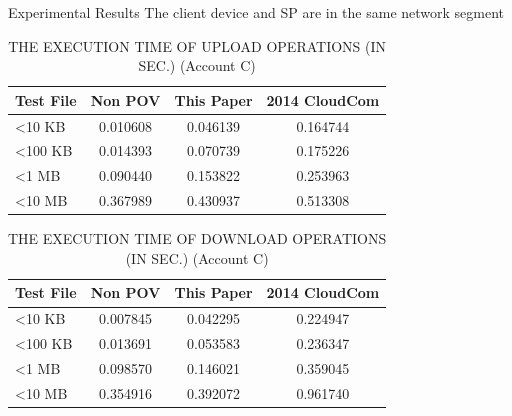 \documentclass{beamer}
\begin{document}
\begin{CJK}{UTF8}{bkai}
\begin{frame}{Experimental Results}
{The client device and SP are in the same network segment}
	\scriptsize
    \begin{table}[]
    \large
    \centering
    \caption{THE EXECUTION TIME OF \alert{UPLOAD} OPERATIONS (IN SEC.) (Account C)}
    \begin{tabular}{lccc}
        Test File        & Non POV  & This Paper & 2014 CloudCom \\ \hline
        \textless 10 KB  & 0.010608 & 0.046139   & 0.164744      \\ \hline
        \textless 100 KB & 0.014393 & 0.070739   & 0.175226      \\ \hline
        \textless 1 MB   & 0.090440 & 0.153822   & 0.253963      \\ \hline
        \textless 10 MB  & 0.367989 & 0.430937   & 0.513308      \\ \hline
    \end{tabular}
    \end{table}
    \begin{table}[]
    \large    
    \centering
    \caption{THE EXECUTION TIME OF \alert{DOWNLOAD} OPERATIONS (IN SEC.) (Account C)}
    \begin{tabular}{lccc}
        Test File        & Non POV  & This Paper & 2014 CloudCom \\ \hline
        \textless 10 KB  & 0.007845 & 0.042295   & 0.224947      \\ \hline
        \textless 100 KB & 0.013691 & 0.053583   & 0.236347      \\ \hline
        \textless 1 MB   & 0.098570 & 0.146021   & 0.359045      \\ \hline
        \textless 10 MB  & 0.354916 & 0.392072   & 0.961740      \\ \hline
    \end{tabular}
    \end{table}
\end{frame}


\end{CJK}
\end{document}
